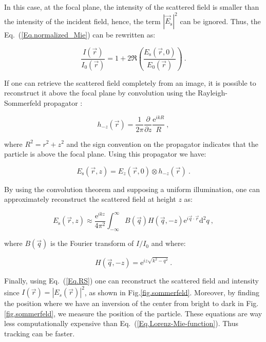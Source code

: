 In this case, at the focal plane, the intensity of the scattered field is smaller than the intensity of the incident field, hence, the term $|\vec{E}_\mathrm{s}|^2$ can be ignored. Thus, the Eq.~(\ref{Eq.normalized_Mie}) can be rewritten as:

\begin{equation}
	\frac{I(\vec{r})}{I_0(\vec{r})}= 1 + 2\Re \left( \frac{E_\mathrm{s}(\vec{r},0)}{E_0(\vec{r})} \right) ~.
\end{equation}

If one can retrieve the scattered field completely from an image, it is possible to reconstruct it above the focal plane by convolution using the Rayleigh-Sommerfeld propagator \cite{goodman_introduction_2005}:

\begin{equation}
	h_{-z}(\vec{r}) = \frac{1}{2 \pi} \frac{\partial}{\partial z} \frac{\mathrm{e}^{ikR}}{R} ~,
\end{equation}

where $ R^2 = r^2 + z^2 $ and the sign convention on the propagator indicates that the particle is above the focal plane. Using this propagator we have:

\begin{equation}
	E_\mathrm{s}(\vec{r}, z) = E_z(\vec{r}, 0) \otimes h_{-z}(\vec{r}) ~.
	\label{Eq:propagator}
\end{equation}

By using the convolution theorem \cite{cheong_strategies_2010, goodman_introduction_2005, sherman_application_1967,schnars_digital_1994} and supposing a uniform illumination, one can approximately reconstruct the scattered field at height $z$ as:

\begin{equation}
	E_\mathrm{s}(\vec{r}, z) \approx \frac{\mathrm{e}^{ikz}}{4\pi ^2}
	\int ^\infty _{- \infty}
	B(\vec{q}) H(\vec{q}, -z) \mathrm{e}^{i \vec{q} \cdot \vec{r}} \mathrm{d}^2 q
	\label{Eq.RS} ~,
\end{equation}

where $B(\vec{q})$ is the Fourier transform of $I/I_0$ and where:

\begin{equation}
	H(\vec{q}, -z) = \mathrm{e}^{iz \sqrt{k^2 - q^2}} ~.
\end{equation}

Finally, using Eq.~(\ref{Eq.RS}) one can reconstruct the scattered field and intensity since $I(\vec{r}) = |E_s(\vec{r})|^2$, as shown in Fig.\ref{fig.sommerfeld}. Moreover, by finding the position where we have an inversion of the center from bright to dark in Fig.\ref{fig.sommerfeld}, we measure the position of the particle.
These equations are way less computationally expensive than Eq.~(\ref{Eq.Lorenz-Mie-function}). Thus tracking can be faster.

